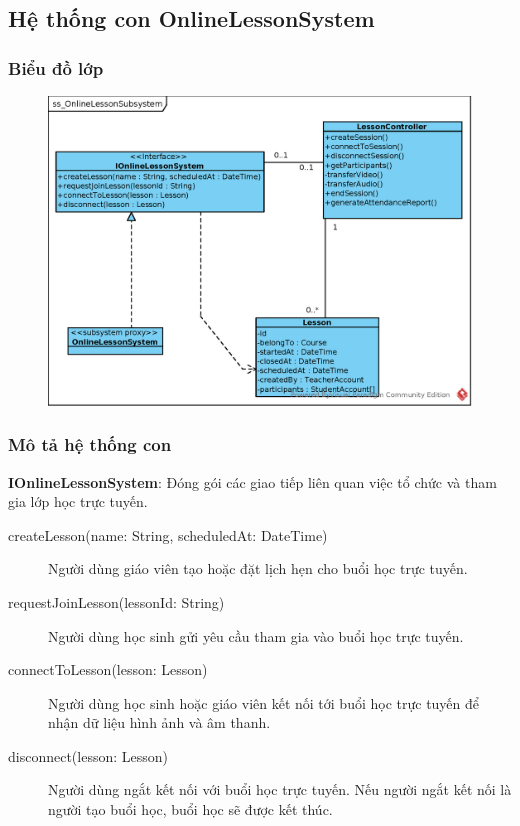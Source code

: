 \documentclass[./../main_file.tex]{subfiles}
\begin{document}
	\subsection{Hệ thống con OnlineLessonSystem}
		\subsubsection{Biểu đồ lớp}
		\begin{figure}[H]
			\centering
			\includegraphics[width=\linewidth]{./images/ss_OnlineLessonSubsystem.eps}
		\end{figure}
		\subsubsection{Mô tả hệ thống con}
		\textbf{IOnlineLessonSystem}: Đóng gói các giao tiếp liên quan việc tổ chức và tham gia lớp học trực tuyến.
		\begin{description}
			\item[createLesson(name: String, scheduledAt: DateTime)] Người dùng giáo viên tạo hoặc đặt lịch hẹn cho buổi học trực tuyến.
			\item[requestJoinLesson(lessonId: String)] Người dùng học sinh gửi yêu cầu tham gia vào buổi học trực tuyến.
			\item[connectToLesson(lesson: Lesson)] Người dùng học sinh hoặc giáo viên kết nối tới buổi học trực tuyến để nhận dữ liệu hình ảnh và âm thanh.
			\item[disconnect(lesson: Lesson)] Người dùng ngắt kết nối với buổi học trực tuyến. Nếu người ngắt kết nối là người tạo buổi học, buổi học sẽ được kết thúc.
		\end{description}
		
\end{document}
